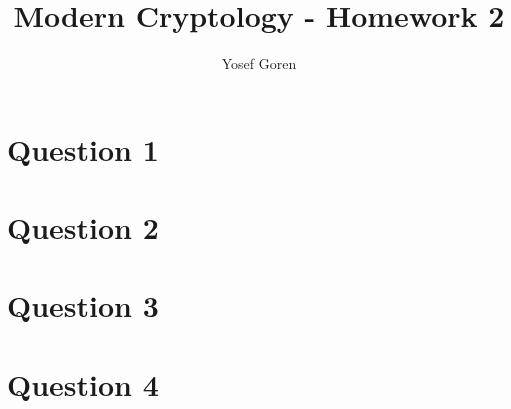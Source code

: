 \documentclass{article}
\begin{document}
\author{Yosef Goren}
\title{Modern Cryptology - Homework 2}
\maketitle

\section*{Question 1}

\section*{Question 2}

\section*{Question 3}

\section*{Question 4}

\end{document}
